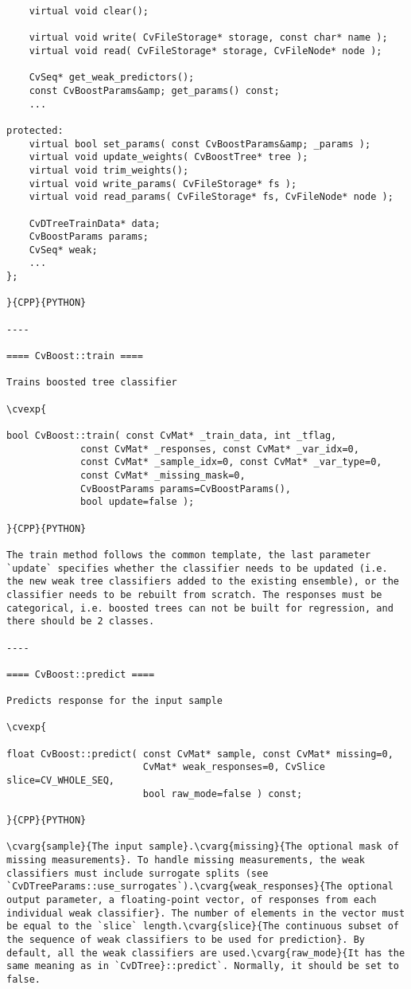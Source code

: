 \begin{verbatim}
    virtual void clear();

    virtual void write( CvFileStorage* storage, const char* name );
    virtual void read( CvFileStorage* storage, CvFileNode* node );

    CvSeq* get_weak_predictors();
    const CvBoostParams&amp; get_params() const;
    ...

protected:
    virtual bool set_params( const CvBoostParams&amp; _params );
    virtual void update_weights( CvBoostTree* tree );
    virtual void trim_weights();
    virtual void write_params( CvFileStorage* fs );
    virtual void read_params( CvFileStorage* fs, CvFileNode* node );

    CvDTreeTrainData* data;
    CvBoostParams params;
    CvSeq* weak;
    ...
};

}{CPP}{PYTHON}

----

==== CvBoost::train ====

Trains boosted tree classifier

\cvexp{

bool CvBoost::train( const CvMat* _train_data, int _tflag,
             const CvMat* _responses, const CvMat* _var_idx=0,
             const CvMat* _sample_idx=0, const CvMat* _var_type=0,
             const CvMat* _missing_mask=0,
             CvBoostParams params=CvBoostParams(),
             bool update=false );

}{CPP}{PYTHON}

The train method follows the common template, the last parameter `update` specifies whether the classifier needs to be updated (i.e. the new weak tree classifiers added to the existing ensemble), or the classifier needs to be rebuilt from scratch. The responses must be categorical, i.e. boosted trees can not be built for regression, and there should be 2 classes.

----

==== CvBoost::predict ====

Predicts response for the input sample

\cvexp{

float CvBoost::predict( const CvMat* sample, const CvMat* missing=0,
                        CvMat* weak_responses=0, CvSlice slice=CV_WHOLE_SEQ,
                        bool raw_mode=false ) const;

}{CPP}{PYTHON}

\cvarg{sample}{The input sample}.\cvarg{missing}{The optional mask of missing measurements}. To handle missing measurements, the weak classifiers must include surrogate splits (see `CvDTreeParams::use_surrogates`).\cvarg{weak_responses}{The optional output parameter, a floating-point vector, of responses from each individual weak classifier}. The number of elements in the vector must be equal to the `slice` length.\cvarg{slice}{The continuous subset of the sequence of weak classifiers to be used for prediction}. By default, all the weak classifiers are used.\cvarg{raw_mode}{It has the same meaning as in `CvDTree}::predict`. Normally, it should be set to false.


\end{verbatim}
